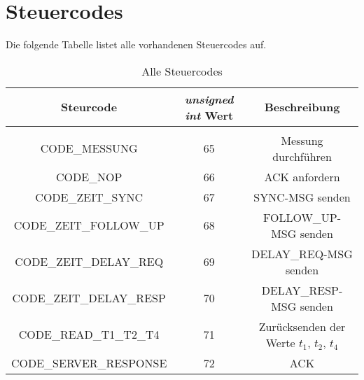 \newpage
\section{Steuercodes}
Die folgende Tabelle listet alle vorhandenen Steuercodes auf.


\begin{table}[H]
\label{table:steuercodes}
\caption{Alle Steuercodes}
\centering
\begin{tabular}{ccc}
\hline
\multicolumn{1}{|c|}{Steurcode}          & \multicolumn{1}{c|}{\textit{unsigned int} Wert} & \multicolumn{1}{c|}{Beschreibung}                    \\ \hline
                                         &                                        &                                                      \\ \hline
\multicolumn{1}{|c|}{CODE\_MESSUNG}      & \multicolumn{1}{c|}{65}                & \multicolumn{1}{c|}{Messung durchführen}             \\ \hline
\multicolumn{1}{|c|}{CODE\_NOP}          & \multicolumn{1}{c|}{66}                & \multicolumn{1}{c|}{ACK anfordern}                      \\ \hline
\multicolumn{1}{|c|}{CODE\_ZEIT\_SYNC}   & \multicolumn{1}{c|}{67}                & \multicolumn{1}{c|}{SYNC-MSG senden} \\ \hline
\multicolumn{1}{|c|}{CODE\_ZEIT\_FOLLOW\_UP} & \multicolumn{1}{c|}{68}                & \multicolumn{1}{c|}{FOLLOW\_UP-MSG senden}         \\ \hline
\multicolumn{1}{|c|}{CODE\_ZEIT\_DELAY\_REQ} & \multicolumn{1}{c|}{69}                & \multicolumn{1}{c|}{DELAY\_REQ-MSG senden}         \\ \hline
\multicolumn{1}{|c|}{CODE\_ZEIT\_DELAY\_RESP} & \multicolumn{1}{c|}{70}                & \multicolumn{1}{c|}{DELAY\_RESP-MSG senden}   \\ \hline
\multicolumn{1}{|c|}{CODE\_READ\_T1\_T2\_T4} & \multicolumn{1}{c|}{71}                & \multicolumn{1}{c|}{Zurücksenden der Werte $t_{1}$, $t_{2}$, $t_{4}$}   \\ \hline
\multicolumn{1}{|c|}{CODE\_SERVER\_RESPONSE}         & \multicolumn{1}{c|}{72}                & \multicolumn{1}{c|}{ACK}                         \\ \hline

\end{tabular}
\end{table}
